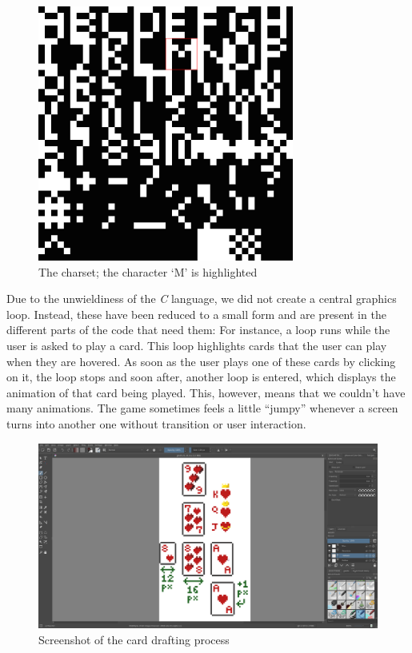 \documentclass[12pt]{article}
\begin{document}
\begin{figure}[ht]
  \caption{\label{charset} The charset; the character `M' is highlighted}
  \begin{center}
    \includegraphics[width=0.75\textwidth]{charset}
  \end{center}
\end{figure}

Due to the unwieldiness of the \textit{C} language, we did not create a central graphics loop.
Instead, these have been reduced to a small form and are present in the different parts of the code that need them:
For instance, a loop runs while the user is asked to play a card. This loop highlights cards that the user can play when they are hovered.
As soon as the user plays one of these cards by clicking on it, the loop stops and soon after, another loop is entered, which displays the animation of that card being played.
This, however, means that we couldn't have many animations. The game sometimes feels a little ``jumpy'' whenever a screen turns into another one without transition or user interaction.

\begin{figure}[ht]
  \caption{Screenshot of the card drafting process}
  \includegraphics[width=1.0\textwidth]{draft-screenshot}
\end{figure}
\end{document}
